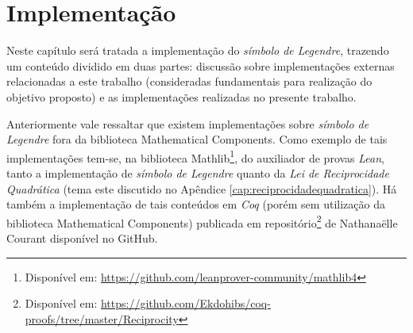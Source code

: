 \chapter{Implementação}
\label{cap:implementacao}

Neste capítulo será tratada a implementação do \textit{símbolo de Legendre}, trazendo um conteúdo dividido em duas partes: discussão sobre implementações externas relacionadas a este trabalho (consideradas fundamentais para realização do objetivo proposto) e as implementações realizadas no presente trabalho.
        
Anteriormente vale ressaltar que existem implementações sobre \textit{símbolo de Legendre} fora da biblioteca Mathematical Components. Como exemplo de tais implementações tem-se, na biblioteca Mathlib\footnote{Disponível em: \url{https://github.com/leanprover-community/mathlib4}}, do auxiliador de provas \textit{Lean}, tanto a implementação de \textit{símbolo de Legendre} quanto da \textit{Lei de Reciprocidade Quadrática}
(tema este discutido no Apêndice \ref{cap:reciprocidadequadratica}). Há também a implementação de tais conteúdos em \textit{Coq} (porém sem utilização da biblioteca Mathematical Components) publicada em repositório\footnote{Disponível em: \url{https://github.com/Ekdohibs/coq-proofs/tree/master/Reciprocity}} de Nathanaëlle Courant disponível no GitHub.



